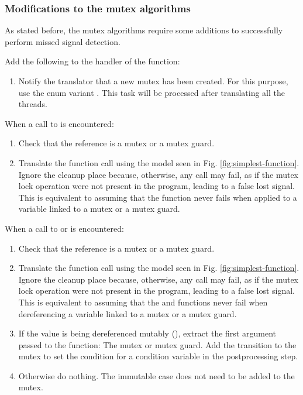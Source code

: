 \subsubsection{Modifications to the mutex algorithms}

As stated before, the mutex algorithms require some additions to successfully
perform missed signal detection.

Add the following to the handler of the  function:

\begin{enumerate}
      \item Notify the translator that a new mutex has been created.
            For this purpose, use the enum variant .
            This task will be processed after translating all the threads.
\end{enumerate}

When a call to  is encountered:

\begin{enumerate}
      \item Check that the  reference is a mutex or a mutex guard.
      \item Translate the function call using the model seen in Fig. \ref{fig:simplest-function}.
            Ignore the cleanup place because, otherwise, any call may fail,
            as if the mutex lock operation
            were not present in the program, leading to a false lost signal.
            This is equivalent to assuming that the  function never fails
            when applied to a variable linked to a mutex or a mutex guard.
\end{enumerate}

When a call to 
or  is encountered:

\begin{enumerate}
      \item Check that the  reference is a mutex or a mutex guard.
      \item Translate the function call using the model seen in Fig. \ref{fig:simplest-function}.
            Ignore the cleanup place because, otherwise, any call may fail,
            as if the mutex lock operation
            were not present in the program, leading to a false lost signal.
            This is equivalent to assuming that the 
            and  functions never fail
            when dereferencing a variable linked to a mutex or a mutex guard.
      \item If the value is being dereferenced mutably (),
            extract the first argument passed to the function: The mutex or mutex guard.
            Add the  transition to the mutex
            to set the condition for a condition variable in the postprocessing step.
      \item Otherwise do nothing.
            The immutable case does not need to be added to the mutex.
\end{enumerate}

